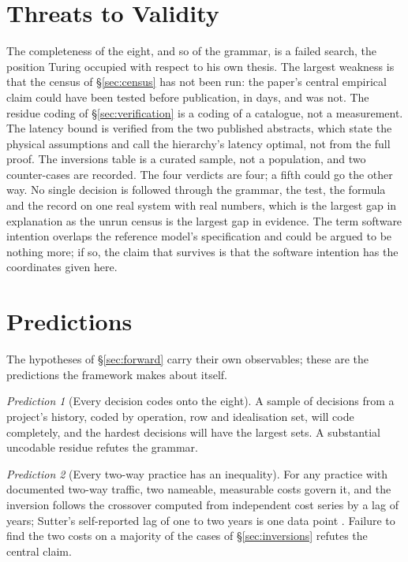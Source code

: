\documentclass[11pt,oneside]{article}
\theoremstyle{definition}
\theoremstyle{remark}
\newtheorem{pred}{Prediction}
\begin{document}
\section{Threats to Validity}\label{sec:limits}
The completeness of the eight, and so of the grammar, is a failed search, the position
Turing occupied with respect to his own thesis. The largest weakness is that the census of \S\ref{sec:census} has not been run: the
paper's central empirical claim could have been tested before publication, in days, and
was not. The residue coding of \S\ref{sec:verification} is a coding of a catalogue, not a
measurement. The latency bound is verified from the two published abstracts, which state
the physical assumptions and call the hierarchy's latency optimal, not from the full
proof. The inversions table is a curated sample, not a population, and two counter-cases
are recorded. The four verdicts are four; a fifth could go the other way. No single decision is followed
through the grammar, the test, the formula and the record on one real system with real
numbers, which is the largest gap in explanation as the unrun census is the largest gap in
evidence. The term software
intention overlaps the reference model's specification and could be argued to be nothing
more; if so, the claim that survives is that the software intention has the coordinates given
here. 

\section{Predictions}\label{sec:predictions}
The hypotheses of
\S\ref{sec:forward} carry their own observables; these are the predictions the framework
makes about itself.

\begin{pred}[Every decision codes onto the eight]
A sample of decisions from a project's history, coded by operation, row and idealisation
set, will code completely, and the hardest decisions will have the largest sets. A
substantial uncodable residue refutes the grammar.
\end{pred}

\begin{pred}[Every two-way practice has an inequality]
For any practice with documented two-way traffic, two nameable, measurable costs govern
it, and the inversion follows the crossover computed from independent cost series by a lag
of years; Sutter's self-reported lag of one to two years is one data point
\cite{sutter2005}. Failure to find the two costs on a majority of the cases of
\S\ref{sec:inversions} refutes the central claim.
\end{pred}
\end{document}
